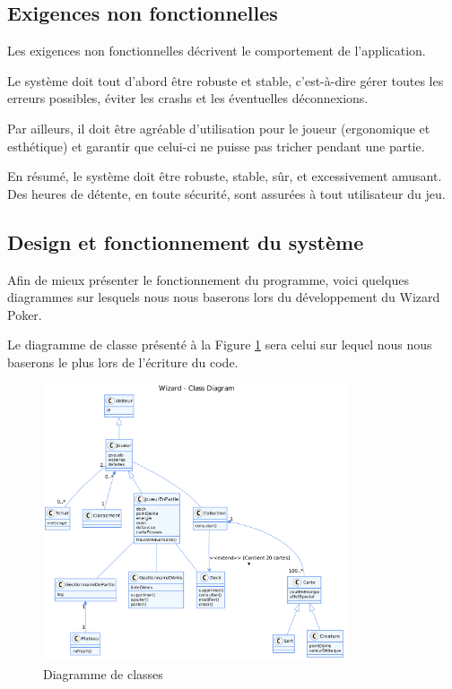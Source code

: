 \documentclass[11pt,a4paper]{article}
\begin{document}
\subsection{Exigences non fonctionnelles}
\label{sec:exi-nonfonc-sys}

Les exigences non fonctionnelles décrivent le comportement de
l'application.

\medbreak

Le système doit tout d'abord être robuste et stable, c'est-à-dire
gérer toutes les erreurs possibles, éviter les crashs et les éventuelles
déconnexions.

\medbreak

Par ailleurs, il doit être agréable d'utilisation pour le joueur
(ergonomique et esthétique) et garantir que celui-ci ne puisse
pas tricher pendant une partie.

\medbreak

En résumé, le système doit être robuste, stable, sûr, et excessivement amusant. Des
heures de détente, en toute sécurité, sont assurées à tout utilisateur du jeu.

\subsection{Design et fonctionnement du système}
\label{sec:design}

Afin de mieux présenter le fonctionnement du programme, voici quelques
diagrammes sur lesquels nous nous baserons lors du
développement du Wizard Poker.

\medbreak

Le diagramme de classe présenté à la Figure \ref{fig:class} sera celui sur lequel nous nous baserons le plus lors de l'écriture du code.

\begin{figure}
  \centering
  \includegraphics[width=0.8\textwidth]{assets/uml/ClassDiagram1.png}
  \caption{\label{fig:class} Diagramme de classes}
\end{figure}
\end{document}
